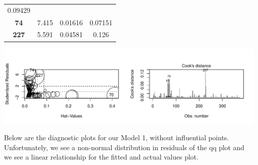 \documentclass[]{elsarticle} %
\makeatletter
\def\maxwidth{\ifdim\Gin@nat@width>\linewidth\linewidth
\else\Gin@nat@width\fi}
\let\Oldincludegraphics\includegraphics
\renewcommand{\includegraphics}[1]{\Oldincludegraphics[width=\maxwidth]{#1}}
\makeatother
\begin{document}
\begin{longtable}[]{@{}cccc@{}}
\begin{minipage}[t]{0.10\columnwidth}
0.09429\strut
\end{minipage}\tabularnewline
\begin{minipage}[t]{0.12\columnwidth}\centering\strut
\textbf{74}\strut
\end{minipage} & \begin{minipage}[t]{0.12\columnwidth}\centering\strut
7.415\strut
\end{minipage} & \begin{minipage}[t]{0.10\columnwidth}\centering\strut
0.01616\strut
\end{minipage} & \begin{minipage}[t]{0.10\columnwidth}\centering\strut
0.07151\strut
\end{minipage}\tabularnewline
\begin{minipage}[t]{0.12\columnwidth}\centering\strut
\textbf{227}\strut
\end{minipage} & \begin{minipage}[t]{0.12\columnwidth}\centering\strut
5.591\strut
\end{minipage} & \begin{minipage}[t]{0.10\columnwidth}\centering\strut
0.04581\strut
\end{minipage} & \begin{minipage}[t]{0.10\columnwidth}\centering\strut
0.126\strut
\end{minipage}\tabularnewline
\bottomrule
\end{longtable}

\includegraphics{Final_Project_files/figure-latex/unnamed-chunk-12-1.pdf}

Below are the diagnostic plots for our Model 1, without influential
points. Unfortunately, we see a non-normal distribution in residuals of
the qq plot and we see a linear relationship for the fitted and actual
values plot.
\end{document}
